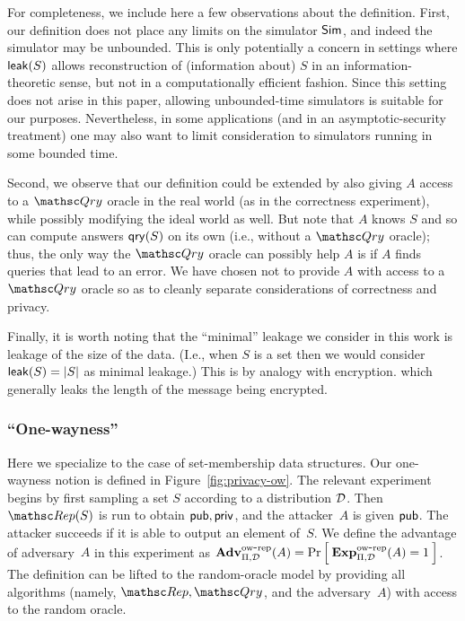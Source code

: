 For completeness, we include here a few observations about the definition.
First, our definition does not place any limits on the simulator ${\sf Sim}$, and indeed
the simulator may be unbounded. This is only potentially a concern in settings
where ${\sf leak}(S)$ allows reconstruction of (information about) $S$ in an information-theoretic
sense, but not in a computationally efficient fashion. Since this setting does not arise
in this paper, allowing unbounded-time simulators is suitable for our purposes. Nevertheless,
in some applications (and in an asymptotic-security treatment) one may also want to limit consideration
to simulators running in some bounded time.

Second, we observe that our definition could be extended by also giving $A$ access to a $\Qry$
oracle in the real world (as in the correctness experiment), while possibly modifying the
ideal world as well. But note that
$A$ knows $S$ and so can compute answers $\mathsf{qry}(S)$ on its own (i.e., without a $\Qry$ oracle);
thus, the only way the $\Qry$ oracle can possibly help $A$ is if $A$ finds queries
that lead to an error.
We have chosen not to provide $A$ with
access to a $\Qry$ oracle so as to cleanly separate considerations
of correctness and privacy.

Finally, it is worth noting that the ``minimal'' leakage we consider in this work
is leakage of the size of the data. (I.e., when $S$ is a set then we would
consider ${\sf leak}(S)=|S|$ as minimal leakage.) This is by analogy with encryption.
which generally leaks the length of the message being encrypted.


\subsubsection{``One-wayness''}

Here we specialize to the case of set-membership data structures.
Our one-wayness notion is defined in Figure~\ref{fig:privacy-ow}.
The relevant experiment begins by first sampling a set $S$ according to a distribution
${\cal D}$. Then $\Rep(S)$ is run to obtain ${\sf pub},{\sf priv}$, and the attacker~$A$ is given
${\sf pub}$. The attacker succeeds if it is able to output an element of~$S$.
We define the advantage of adversary~$A$ in this experiment
as $\mathrm{\mathbf{Adv}}^{\mathrm{ow\mbox{-}rep}}_{\Pi,\mathcal{D}}(A) = \Pr\left[\: \mathrm{\mathbf{Exp}}^{\mathrm{ow\mbox{-}rep}}_{\Pi,{\cal D}}(A)=1 \:\right]$.
The definition can be lifted to the random-oracle model by providing
all algorithms (namely, $\Rep,\Qry$, and the adversary~$A$) with access to the
random oracle.

